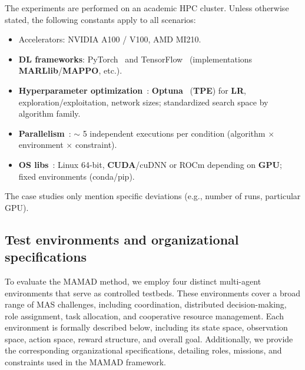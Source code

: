 \documentclass[pdflatex,sn-mathphys-num]{sn-jnl}%
\theoremstyle{thmstyleone}%
\theoremstyle{thmstyletwo}%
\theoremstyle{thmstylethree}%
\begin{document}
The experiments are performed on an academic HPC cluster. Unless otherwise stated, the following constants apply to all scenarios:
\begin{itemize}
    \item Accelerators: NVIDIA A100 / V100, AMD MI210.
    \item \textbf{DL frameworks}: PyTorch~\cite{Paszke2019} and TensorFlow~\cite{Abadi2016} (implementations \textbf{MARLlib}/\textbf{MAPPO}, etc.).
    \item \textbf{Hyperparameter optimization}~: \textbf{Optuna}~\cite{akiba2019optuna} (\textbf{TPE}) for \textbf{LR}, exploration/exploitation, network sizes; standardized search space by algorithm family.
    \item \textbf{Parallelism}~: $\sim$ 5 independent executions per condition (algorithm $\times$ environment $\times$ constraint).
    \item \textbf{\textbf{OS} libs}~: Linux 64-bit, \textbf{CUDA}/cuDNN or ROCm depending on \textbf{GPU}; fixed environments (conda/pip).
\end{itemize}
The case studies only mention specific deviations (e.g., number of runs, particular GPU).

\subsection{Test environments and organizational specifications}

To evaluate the MAMAD method, we employ four distinct multi-agent environments that serve as controlled testbeds. These environments cover a broad range of MAS challenges, including coordination, distributed decision-making, role assignment, task allocation, and cooperative resource management. Each environment is formally described below, including its state space, observation space, action space, reward structure, and overall goal. Additionally, we provide the corresponding organizational specifications, detailing roles, missions, and constraints used in the MAMAD framework.
\end{document}
